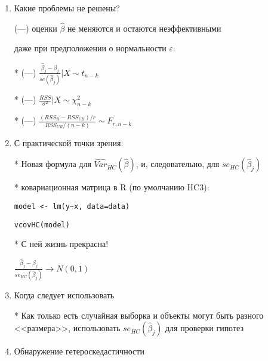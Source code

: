 \documentclass[12pt,a4paper]{article}
\begin{document}
{\begin{enumerate}
* Вместо $\widehat{Var}(\hat{\beta})=\frac{RSS}{n-k}(X'X)^{-1}$ 

использовать $\widehat{Var}_{HC}(\hat{\beta})=(X'X)^{-1}X'\hat{\Omega}X(X'X)^{-1}$

* Уайт, 1980, HC0: 

$\hat{\Omega}=diag( \hat{\varepsilon}_1^2, \ldots, \hat{\varepsilon}_n^2 )$

* Современный вариант, HC3: 

$\hat{\Omega}=diag \left( \frac{\hat{\varepsilon}_1^2}{(1-h_{11})^2}, \ldots, \frac{\varepsilon_n^2}{(1-h_{nn})^2} \right)$

\newpage
\newpage Суть корректировки:

Мы меняем $se(\hat{\beta}_j)$ на $se_{HC}(\hat{\beta}_j)$

Какие проблемы решены?

* $\frac{\hat{\beta}_j-\beta_j}{se_{HC}(\hat{\beta}_j)} \to N(0,1)$ (УРА!)

\item Какие проблемы не решены?

(---) оценки $\hat{\beta}$ не меняются и остаются неэффективными

даже при предположении о нормальности $\varepsilon$:

* (---) $\frac{\hat{\beta}_j-\beta_j}{se(\hat{\beta}_j)} | X \sim t_{n-k}$

* (---) $\frac{RSS}{\sigma^2} |X \sim \chi^2_{n-k}$

* (---) $\frac{(RSS_R-RSS_{UR})/r}{RSS_{UR}/(n-k)} \sim F_{r,n-k}$

\newpage
\item С практической точки зрения:

* Новая формула для $\widehat{Var}_{HC}(\hat{\beta})$, и, следовательно, для  $se_{HC}(\hat{\beta}_j)$

* ковариационная матрица в R (по умолчанию HC3):

\verb|model <- lm(y~x, data=data)|

\verb|vcovHC(model)|

* С ней жизнь прекрасна!

$\frac{\hat{\beta}_j-\beta_j}{se_{HC}(\hat{\beta}_j)} \to N(0,1)$

\item Когда следует использовать 

* Как только есть случайная выборка и объекты могут быть разного <<размера>>, использовать $se_{HC}(\hat{\beta}_j)$ для проверки гипотез

\newpage
\item Обнаружение гетероскедастичности


\end{enumerate}}
\end{document}
